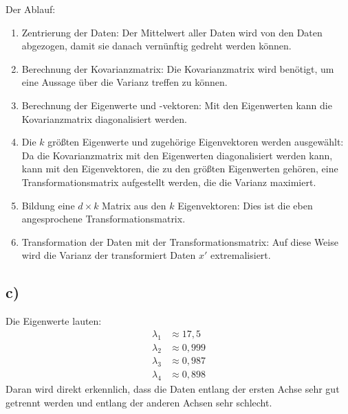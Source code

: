 \documentclass[a4paper, 11pt]{article}
\begin{document}
Der Ablauf:
\begin{enumerate}
    \item Zentrierung der Daten: Der Mittelwert aller Daten wird von den Daten abgezogen, damit sie danach vernünftig gedreht werden können.
    \item Berechnung der Kovarianzmatrix: Die Kovarianzmatrix wird benötigt, um eine Aussage über die Varianz treffen zu können.
    \item Berechnung der Eigenwerte und -vektoren: Mit den Eigenwerten kann die Kovarianzmatrix diagonalisiert werden.
    \item Die $k$ größten Eigenwerte und zugehörige Eigenvektoren werden ausgewählt: Da die Kovarianzmatrix mit den Eigenwerten diagonalisiert werden kann, kann mit den Eigenvektoren, die zu den größten Eigenwerten gehören, eine Transformationsmatrix aufgestellt werden, die die Varianz maximiert.
    \item Bildung eine $d\times k$ Matrix aus den $k$ Eigenvektoren: Dies ist die eben angesprochene Transformationsmatrix.
    \item Transformation der Daten mit der Transformationsmatrix: Auf diese Weise wird die Varianz der transformiert Daten $x'$ extremalisiert.
\end{enumerate}

\subsection*{c)}
Die Eigenwerte lauten:
\begin{align*}
    \lambda_1 &\approx 17,5 \\
    \lambda_2 &\approx 0,999\\
    \lambda_3 &\approx 0,987\\
    \lambda_4 &\approx 0,898
\end{align*}
Daran wird direkt erkennlich, dass die Daten entlang der ersten Achse sehr gut getrennt werden und entlang der anderen Achsen sehr schlecht.
\end{document}
